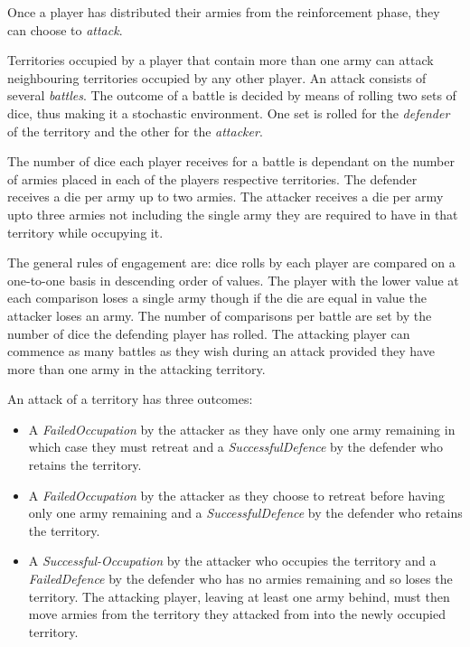 \documentclass[parskip]{cs4rep}
\begin{document}
Once a player has distributed their armies from the reinforcement phase, they can choose to \textit{attack}. 

Territories occupied by a player that contain more than one army can attack neighbouring territories occupied by any other player. An attack consists of several \textit{battles}. The outcome of a battle is decided by means of rolling two sets of dice, thus making it a stochastic environment. One set is rolled for the \textit{defender} of the territory and the other for the \textit{attacker}. 

The number of dice each player receives for a battle is dependant on the number of armies placed in each of the players respective territories. The defender receives a die per army up to two armies. The attacker receives a die per army upto three armies not including the single army they are required to have in that territory while occupying it. 

The general rules of engagement are: dice rolls by each player are compared on a one-to-one basis in descending order of values. The player with the lower value at each comparison loses a single army though if the die are equal in value the attacker loses an army. The number of comparisons per battle are set by the number of dice the defending player has rolled. The attacking player can commence as many battles as they wish during an attack provided they have more than one army in the attacking territory.

An attack of a territory has three outcomes:

\begin{itemize}
\item
A \textit{FailedOccupation} by the attacker as they have only one army remaining in which case they must retreat and a \textit{SuccessfulDefence} by the defender who retains the territory.
\item
A \textit{FailedOccupation} by the attacker as they choose to retreat before having only one army remaining and a \textit{SuccessfulDefence} by the defender who retains the territory.
\item
A \textit{Successful-Occupation} by the attacker who occupies the territory and a \textit{FailedDefence} by the defender who has no armies remaining and so loses the territory. The attacking player, leaving at least one army behind, must then move armies from the territory they attacked from into the newly occupied territory.
\end{itemize}
\end{document}
